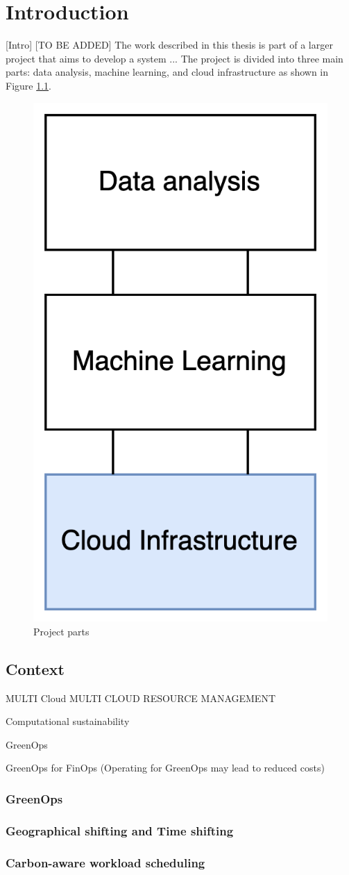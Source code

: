 \chapter{Introduction}
\label{cha:introduction}

[Intro]
[TO BE ADDED]
The work described in this thesis is part of a larger project that aims to develop a system ... 
The project is divided into three main parts: data analysis, machine learning, and cloud infrastructure as shown in Figure \ref{fig:project_parts}.

\begin{figure}[htb]
    \centering
    \includegraphics[width=0.25\linewidth]{images/project_parts.png}
    \caption{Project parts}
    \label{fig:project_parts}
\end{figure}

\section{Context}
\label{sec:context}


MULTI Cloud
MULTI CLOUD RESOURCE MANAGEMENT


Computational sustainability

GreenOps

GreenOps for FinOps
(Operating for GreenOps may lead to reduced costs)

\subsection{GreenOps}
\subsection{Geographical shifting and Time shifting}
\subsection{Carbon-aware workload scheduling}


